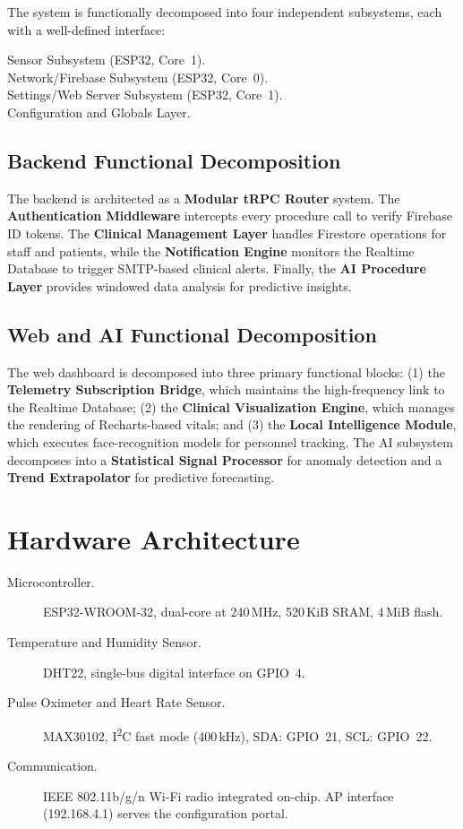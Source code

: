 The system is functionally decomposed into four independent subsystems, each with a
well-defined interface:

\begin{description}
	\item[Sensor Subsystem (ESP32, Core~1).]
	\item[Network/Firebase Subsystem (ESP32, Core~0).]
	\item[Settings/Web Server Subsystem (ESP32, Core~1).]
	\item[Configuration and Globals Layer.]
\end{description}

\subsection*{Backend Functional Decomposition}
The backend is architected as a \textbf{Modular tRPC Router} system. The \textbf{Authentication Middleware} intercepts every procedure call to verify Firebase ID tokens. The \textbf{Clinical Management Layer} handles Firestore operations for staff and patients, while the \textbf{Notification Engine} monitors the Realtime Database to trigger SMTP-based clinical alerts. Finally, the \textbf{AI Procedure Layer} provides windowed data analysis for predictive insights.

\subsection*{Web and AI Functional Decomposition}
The web dashboard is decomposed into three primary functional blocks: (1) the \textbf{Telemetry Subscription Bridge}, which maintains the high-frequency link to the Realtime Database; (2) the \textbf{Clinical Visualization Engine}, which manages the rendering of Recharts-based vitals; and (3) the \textbf{Local Intelligence Module}, which executes face-recognition models for personnel tracking. The AI subsystem decomposes into a \textbf{Statistical Signal Processor} for anomaly detection and a \textbf{Trend Extrapolator} for predictive forecasting.

\section{Hardware Architecture}

\begin{description}
	\item[Microcontroller.]
	      ESP32-WROOM-32, dual-core at 240\,MHz,
	      520\,KiB SRAM, 4\,MiB flash.

	\item[Temperature and Humidity Sensor.]
	      DHT22, single-bus digital interface on GPIO~4.

	\item[Pulse Oximeter and Heart Rate Sensor.]
	      MAX30102, I\textsuperscript{2}C fast mode (400\,kHz), SDA: GPIO~21,
	      SCL: GPIO~22.

	\item[Communication.]
	      IEEE 802.11b/g/n Wi-Fi radio integrated on-chip.
	      AP interface (192.168.4.1) serves the configuration portal.
\end{description}

